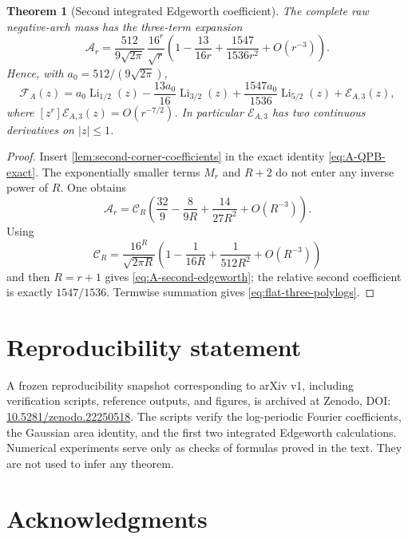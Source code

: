 \documentclass[11pt]{article}
\newtheorem{theorem}{Theorem}[section]
\theoremstyle{definition}
\theoremstyle{remark}
\begin{document}
\begin{theorem}[Second integrated Edgeworth coefficient]
\label{thm:second-integrated-edgeworth}
The complete raw negative-arch mass has the three-term expansion
\begin{equation}
 \boxed{
 \mathcal A_r
 =\frac{512}{9\sqrt{2\pi}}\,
 \frac{16^r}{\sqrt r}
 \left(
 1-\frac{13}{16r}+\frac{1547}{1536r^2}+O(r^{-3})
 \right).}
 \label{eq:A-second-edgeworth}
\end{equation}
Hence, with $a_0=512/(9\sqrt{2\pi})$,
\begin{equation}
 {
 \mathscr F_{\!A}(z)
 =a_0\operatorname{Li}_{1/2}(z)
 -\frac{13a_0}{16}\operatorname{Li}_{3/2}(z)
 +\frac{1547a_0}{1536}\operatorname{Li}_{5/2}(z)
 +\mathscr E_{A,3}(z),}
 \label{eq:flat-three-polylogs}
\end{equation}
where $[z^r]\mathscr E_{A,3}(z)=O(r^{-7/2})$.  In particular
$\mathscr E_{A,3}$ has two continuous derivatives on $|z|\le1$.
\end{theorem}

\begin{proof}
Insert \cref{lem:second-corner-coefficients} in the exact identity
\eqref{eq:A-QPB-exact}.  The exponentially smaller terms $M_r$ and $R+2$
do not enter any inverse power of $R$.  One obtains
\[
 \mathcal A_r
 =\mathscr C_R\left(
 \frac{32}{9}-\frac{8}{9R}+\frac{14}{27R^2}
 +O(R^{-3})\right).
\]
Using
\[
 \mathscr C_R
 =\frac{16^R}{\sqrt{2\pi R}}
 \left(1-\frac1{16R}+\frac1{512R^2}+O(R^{-3})\right)
\]
and then $R=r+1$ gives \eqref{eq:A-second-edgeworth}; the relative
second coefficient is exactly $1547/1536$.  Termwise summation gives
\eqref{eq:flat-three-polylogs}.
\end{proof}

\section*{Reproducibility statement}

A frozen reproducibility snapshot corresponding to arXiv v1, including
verification scripts, reference outputs, and figures, is archived at Zenodo,
DOI:
\href{https://doi.org/10.5281/zenodo.22250518}
{10.5281/zenodo.22250518}.  The scripts verify the log-periodic Fourier
coefficients, the Gaussian area identity, and the first two integrated
Edgeworth calculations.  Numerical experiments serve only as checks of
formulas proved in the text.  They are not used to infer any theorem.

\section*{Acknowledgments}
\end{document}
